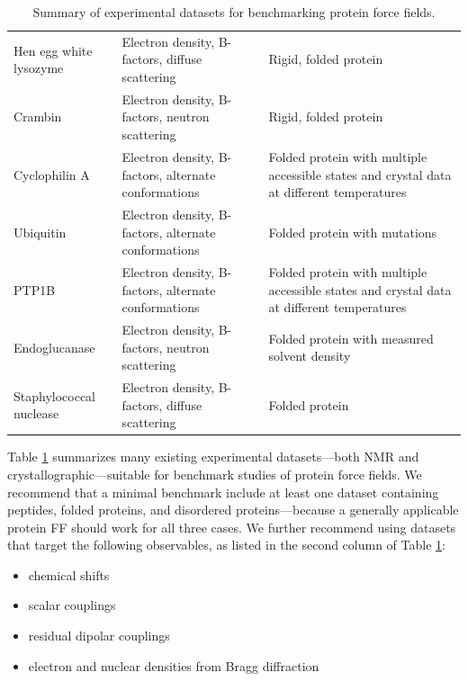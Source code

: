 \documentclass[9pt,review]{livecoms}
\begin{document}
\begin{table}[!ht]
\begin{tabular}{p{} p{} p{}}
Hen egg white lysozyme \cite{ramanadham_refinement_1990,meisburger_diffuse_2020,walsh_refinement_1998,wang_triclinic_2007,artymiuk_structures_1982,meisburger_robust_2023} & Electron density, B-factors, diffuse scattering & Rigid, folded protein \\
Crambin \cite{teeter_water_1984,chen_room-temperature_2012} & Electron density, B-factors, neutron scattering & Rigid, folded protein \\
Cyclophilin A \cite{keedy_mapping_2015,van_benschoten_measuring_2016,thompson_temperature-jump_2019,chen_solvent_2024} & Electron density, B-factors, alternate conformations & Folded protein with multiple accessible states and crystal data at different temperatures \\
Ubiquitin \cite{biel_flexibility_2017} & Electron density, B-factors, alternate conformations & Folded protein with mutations \\
PTP1B \cite{keedy_expanded_2018} & Electron density, B-factors, alternate conformations & Folded protein with multiple accessible states and crystal data at different temperatures \\
Endoglucanase \cite{nakamura_newtons_2015} & Electron density, B-factors, neutron scattering & Folded protein with measured solvent density \\
Staphylococcal nuclease \cite{wall_conformational_2014} & Electron density, B-factors, diffuse scattering & Folded protein \\
\bottomrule
\end{tabular}
\caption{Summary of experimental datasets for benchmarking protein force fields.}
\label{tab:datasets}
\end{table}

Table \ref{tab:datasets} summarizes many existing experimental datasets---both NMR and 
crystallographic---suitable for benchmark studies of protein force fields.
We recommend that a minimal benchmark include at least one dataset containing peptides, folded proteins, and disordered proteins---because a generally applicable protein FF should work for all three cases.
We further recommend using datasets that target the following observables, as listed in the second column of Table \ref{tab:datasets}:

\begin{itemize}
\item chemical shifts
\item scalar couplings
\item residual dipolar couplings
\item electron and nuclear densities from Bragg diffraction
\end{itemize}
\end{document}
